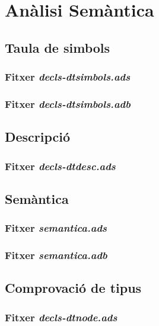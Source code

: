\section{Anàlisi Semàntica}

\subsection{Taula de simbols}
\subsubsection{Fitxer \emph{decls-dtsimbols.ads}}

\newpage

\subsubsection{Fitxer \emph{decls-dtsimbols.adb}}

\newpage

\subsection{Descripció}
\subsubsection{Fitxer \emph{decls-dtdesc.ads}}

\newpage

\subsection{Semàntica}
\subsubsection{Fitxer \emph{semantica.ads}}

\newpage

\subsubsection{Fitxer \emph{semantica.adb}}

\newpage

\subsection{Comprovació de tipus}
\subsubsection{Fitxer \emph{decls-dtnode.ads}}

\newpage


